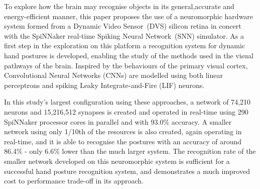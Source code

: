 %

%
%
%
%

To explore how the brain may recognise objects in its general,accurate and energy-efficient manner, this paper proposes the use of a neuromorphic hardware system formed from a Dynamic Video Sensor~(DVS)
silicon retina in concert with the SpiNNaker real-time Spiking Neural
Network~(SNN) simulator.
As a first step in the exploration on this platform a recognition system for dynamic hand postures is developed, enabling the study of the methods used in the visual pathways of the brain.
Inspired by the behaviours of the primary visual cortex, Convolutional Neural Networks (CNNs) are modelled using both linear perceptrons and spiking Leaky Integrate-and-Fire (LIF) neurons.

In this study's largest configuration using these approaches, a network of 74,210 neurons and 15,216,512 synapses is created and operated in real-time using 290 SpiNNaker processor cores in parallel and with 93.0\% accuracy.
A smaller network using only 1/10th of the resources is also created,
again operating in real-time, and it is able to recognise the postures
with an accuracy of around 86.4\% - only 6.6\% lower than the much larger system.
The recognition rate of the smaller network developed on this neuromorphic system is sufficient for a successful hand posture recognition system, and demonstrates a much improved cost to performance trade-off in its approach.

